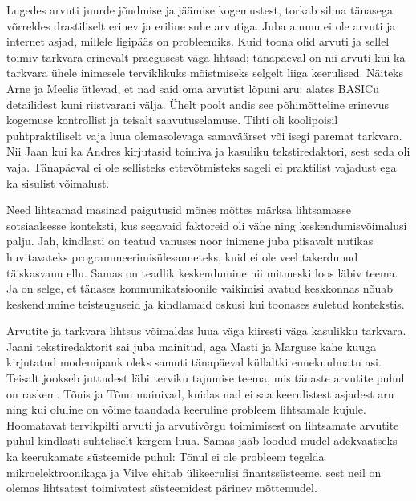 Lugedes arvuti juurde jõudmise ja jäämise kogemustest, torkab 
silma tänasega võrreldes drastiliselt erinev ja eriline suhe arvutiga. Juba ammu ei ole arvuti ja 
internet asjad, millele ligipääs on probleemiks. Kuid toona olid arvuti ja 
sellel toimiv tarkvara erinevalt praegusest väga lihtsad; tänapäeval on nii arvuti kui ka
tarkvara ühele inimesele terviklikuks mõistmiseks selgelt liiga keerulised. Näiteks Arne ja Meelis ütlevad, et nad said oma arvutist lõpuni aru: alates BASICu 
detailidest kuni riistvarani välja. Ühelt poolt andis see põhimõtteline 
erinevus kogemuse kontrollist ja teisalt saavutuselamuse. Tihti oli koolipoisil 
puhtpraktiliselt vaja luua olemasolevaga samaväärset või isegi paremat 
tarkvara. Nii Jaan kui ka Andres kirjutasid toimiva ja kasuliku 
tekstiredaktori, sest seda oli vaja. Tänapäeval ei ole sellisteks 
ettevõtmisteks sageli ei praktilist vajadust ega ka sisulist võimalust.

Need lihtsamad masinad paigutusid mõnes mõttes märksa lihtsamasse sotsiaalsesse 
konteksti, kus segavaid faktoreid oli vähe ning keskendumisvõimalusi palju. 
Jah, kindlasti on teatud vanuses noor inimene juba piisavalt nutikas 
huvitavateks programmeerimisülesanneteks, kuid ei ole veel takerdunud 
täiskasvanu ellu. Samas on teadlik keskendumine nii mitmeski loos 
läbiv teema. Ja on selge, et tänases kommunikatsioonile vaikimisi avatud 
keskkonnas nõuab keskendumine teistsuguseid ja kindlamaid oskusi kui toonases 
suletud kontekstis.

Arvutite ja tarkvara lihtsus võimaldas luua väga kiiresti väga 
kasulikku tarkvara. Jaani tekstiredaktorit sai juba mainitud, aga Masti ja 
Marguse kahe kuuga kirjutatud modemipank oleks samuti tänapäeval küllaltki 
ennekuulmatu asi. Teisalt jookseb juttudest läbi terviku tajumise teema, 
mis tänaste arvutite puhul on raskem. Tõnis ja Tõnu mainivad, kuidas nad ei saa 
keerulistest asjadest aru ning kui oluline on võime taandada keeruline 
probleem lihtsamale kujule. Hoomatavat tervikpilti arvuti ja 
arvutivõrgu toimimisest on lihtsamate arvutite puhul kindlasti suhteliselt 
kergem luua. Samas jääb loodud mudel adekvaatseks ka keerukamate 
süsteemide puhul: Tõnul ei ole probleem tegelda mikroelektroonikaga ja Vilve 
ehitab ülikeerulisi finantssüsteeme, sest neil on olemas lihtsatest toimivatest 
süsteemidest pärinev mõttemudel.

